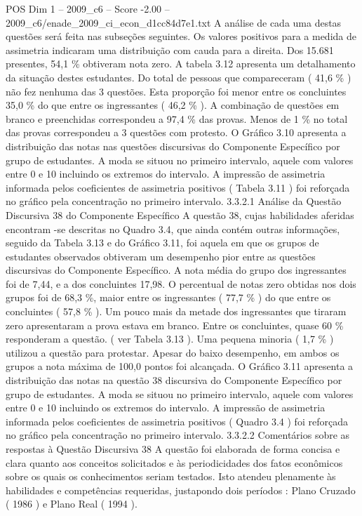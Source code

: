 \begin{textsample}{POS Dim 1 – 2009\_c6 – Score -2.00 – 2009\_c6/enade\_2009\_ci\_econ\_d1cc84d7e1.txt}
A análise de cada uma destas questões será feita nas subseções seguintes.
Os valores positivos para a medida de assimetria indicaram uma distribuição com cauda para a direita.
Dos 15.681 presentes, 54,1 \% obtiveram nota zero.
A tabela 3.12 apresenta um detalhamento da situação destes estudantes.
Do total de pessoas que compareceram ( 41,6 \% ) não fez nenhuma das 3 questões.
Esta proporção foi menor entre os concluintes 35,0 \% do que entre os ingressantes ( 46,2 \% ).
A combinação de questões em branco e preenchidas correspondeu a 97,4 \% das provas.
Menos de 1 \% no total das provas correspondeu a 3 questões com protesto.
O Gráfico 3.10 apresenta a distribuição das notas nas questões discursivas do Componente Específico por grupo de estudantes.
A moda se situou no primeiro intervalo, aquele com valores entre 0 e 10 incluindo os extremos do intervalo.
A impressão de assimetria informada pelos coeficientes de assimetria positivos ( Tabela 3.11 ) foi reforçada no gráfico pela concentração no primeiro intervalo. 3.3.2.1 Análise da Questão Discursiva 38 do Componente Específico A questão 38, cujas habilidades aferidas encontram -se descritas no Quadro 3.4, que ainda contém outras informações, seguido da Tabela 3.13 e do Gráfico 3.11, foi aquela em que os grupos de estudantes observados obtiveram um desempenho pior entre as questões discursivas do Componente Específico.
A nota média do grupo dos ingressantes foi de 7,44, e a dos concluintes 17,98.
O percentual de notas zero obtidas nos dois grupos foi de 68,3 \%, maior entre os ingressantes ( 77,7 \% ) do que entre os concluintes ( 57,8 \% ).
Um pouco mais da metade dos ingressantes que tiraram zero apresentaram a prova estava em branco.
Entre os concluintes, quase 60 \% responderam a questão. ( ver Tabela 3.13 ).
Uma pequena minoria ( 1,7 \% ) utilizou a questão para protestar.
Apesar do baixo desempenho, em ambos os grupos a nota máxima de 100,0 pontos foi alcançada.
O Gráfico 3.11 apresenta a distribuição das notas na questão 38 discursiva do Componente Específico por grupo de estudantes.
A moda se situou no primeiro intervalo, aquele com valores entre 0 e 10 incluindo os extremos do intervalo.
A impressão de assimetria informada pelos coeficientes de assimetria positivos ( Quadro 3.4 ) foi reforçada no gráfico pela concentração no primeiro intervalo. 3.3.2.2 Comentários sobre as respostas à Questão Discursiva 38 A questão foi elaborada de forma concisa e clara quanto aos conceitos solicitados e às periodicidades dos fatos econômicos sobre os quais os conhecimentos seriam testados.
Isto atendeu plenamente às habilidades e competências requeridas, justapondo dois períodos : Plano Cruzado ( 1986 ) e Plano Real ( 1994 ).

\end{textsample}
